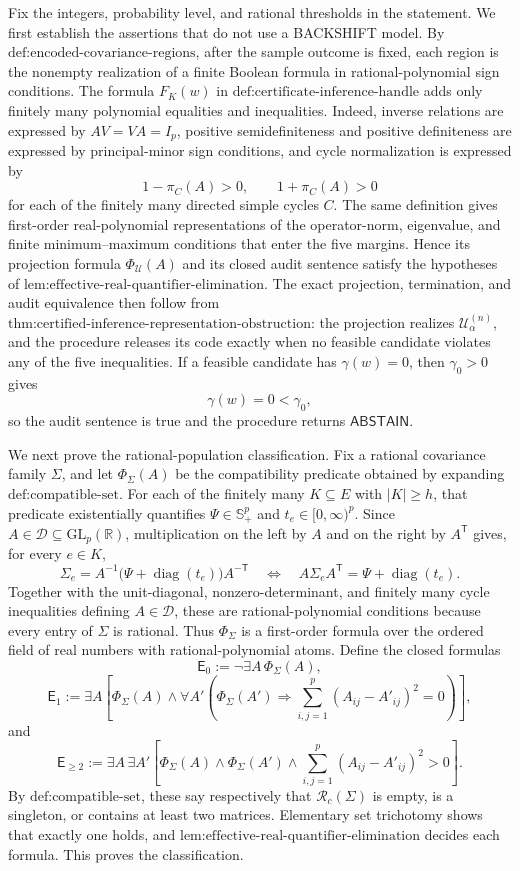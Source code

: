 Fix the integers, probability level, and rational thresholds in the statement. We first establish the assertions that do not use a BACKSHIFT model. By \(\text{def:encoded-covariance-regions}\), after the sample outcome is fixed, each region is the nonempty realization of a finite Boolean formula in rational-polynomial sign conditions. The formula \(F_K(w)\) in \(\text{def:certificate-inference-handle}\) adds only finitely many polynomial equalities and inequalities. Indeed, inverse relations are expressed by \(AV=VA=I_p\), positive semidefiniteness and positive definiteness are expressed by principal-minor sign conditions, and cycle normalization is expressed by
\[
1-\pi_C(A)>0,
\qquad
1+\pi_C(A)>0
\]
for each of the finitely many directed simple cycles \(C\). The same definition gives first-order real-polynomial representations of the operator-norm, eigenvalue, and finite minimum--maximum conditions that enter the five margins. Hence its projection formula \(\Phi_{\mathcal U}(A)\) and its closed audit sentence satisfy the hypotheses of \(\text{lem:effective-real-quantifier-elimination}\). The exact projection, termination, and audit equivalence then follow from \(\text{thm:certified-inference-representation-obstruction}\): the projection realizes \(\mathcal U^{(n)}_\alpha\), and the procedure releases its code exactly when no feasible candidate violates any of the five inequalities. If a feasible candidate has \(\gamma(w)=0\), then \(\gamma_0>0\) gives
\[
\gamma(w)=0<\gamma_0,
\]
so the audit sentence is true and the procedure returns \(\mathsf{ABSTAIN}\).

We next prove the rational-population classification. Fix a rational covariance family \(\Sigma\), and let \(\Phi_\Sigma(A)\) be the compatibility predicate obtained by expanding \(\text{def:compatible-set}\). For each of the finitely many \(K\subseteq E\) with \(|K|\geq h\), that predicate existentially quantifies \(\Psi\in\mathbb S_+^p\) and \(t_e\in[0,\infty)^p\). Since \(A\in\mathcal D\subseteq\mathrm{GL}_p(\mathbb R)\), multiplication on the left by \(A\) and on the right by \(A^{\mathsf T}\) gives, for every \(e\in K\),
\[
\Sigma_e=A^{-1}\bigl(\Psi+\operatorname{diag}(t_e)\bigr)A^{-\mathsf T}
\quad\Longleftrightarrow\quad
A\Sigma_eA^{\mathsf T}=\Psi+\operatorname{diag}(t_e).
\]
Together with the unit-diagonal, nonzero-determinant, and finitely many cycle inequalities defining \(A\in\mathcal D\), these are rational-polynomial conditions because every entry of \(\Sigma\) is rational. Thus \(\Phi_\Sigma\) is a first-order formula over the ordered field of real numbers with rational-polynomial atoms. Define the closed formulas
\[
\mathsf E_0:=\neg\exists A\,\Phi_\Sigma(A),
\]
\[
\mathsf E_1:=\exists A\left[\Phi_\Sigma(A)\wedge
\forall A'\left(\Phi_\Sigma(A')\Rightarrow
\sum_{i,j=1}^p(A_{ij}-A'_{ij})^2=0\right)\right],
\]
and
\[
\mathsf E_{\geq2}:=\exists A\,\exists A'\left[
\Phi_\Sigma(A)\wedge\Phi_\Sigma(A')\wedge
\sum_{i,j=1}^p(A_{ij}-A'_{ij})^2>0\right].
\]
By \(\text{def:compatible-set}\), these say respectively that \(\mathcal R_c(\Sigma)\) is empty, is a singleton, or contains at least two matrices. Elementary set trichotomy shows that exactly one holds, and \(\text{lem:effective-real-quantifier-elimination}\) decides each formula. This proves the classification.


